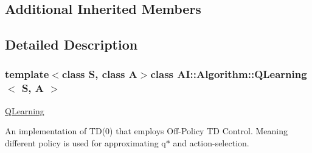 \subsection*{Additional Inherited Members}


\subsection{Detailed Description}
\subsubsection*{template$<$class S, class A$>$class A\-I\-::\-Algorithm\-::\-Q\-Learning$<$ S, A $>$}

\hyperlink{classAI_1_1Algorithm_1_1QLearning}{Q\-Learning} 

An implementation of T\-D(0) that employs Off-\/\-Policy T\-D Control. Meaning different policy is used for approximating q$\ast$ and action-\/selection. 

